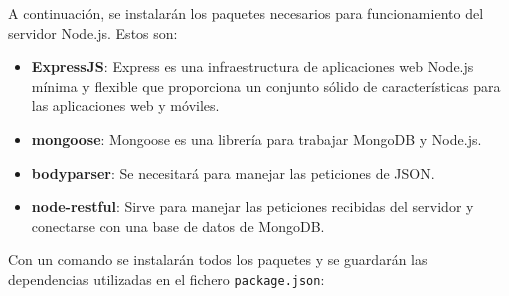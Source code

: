 A continuación, se instalarán los paquetes necesarios para funcionamiento del servidor Node.js. Estos son:

\begin{itemize}
    \item \textbf{ExpressJS}: Express es una infraestructura de aplicaciones web Node.js mínima y flexible que proporciona un conjunto sólido de características para las aplicaciones web y móviles.
    \item \textbf{mongoose}: Mongoose es una librería para trabajar MongoDB y Node.js.
    \item \textbf{bodyparser}: Se necesitará para manejar las peticiones de JSON.
    \item \textbf{node-restful}: Sirve para manejar las peticiones recibidas del servidor y conectarse con una base de datos de MongoDB.
\end{itemize}

Con un comando se instalarán todos los paquetes y se guardarán las dependencias utilizadas en el fichero \texttt{package.json}:


